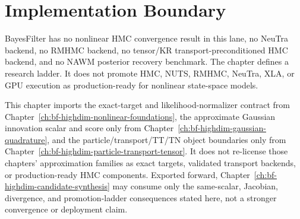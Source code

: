 \section{Implementation Boundary}
\label{sec:bf-hd-hmc-boundary}

BayesFilter has no nonlinear HMC convergence result in this lane, no NeuTra
backend, no RMHMC backend, no tensor/KR transport-preconditioned HMC backend,
and no NAWM posterior recovery benchmark.  The chapter defines a research
ladder.  It does not promote HMC, NUTS, RMHMC, NeuTra, XLA, or GPU execution as
production-ready for nonlinear state-space models.

This chapter imports the exact-target and likelihood-normalizer contract from
Chapter~\ref{ch:bf-highdim-nonlinear-foundations}, the approximate Gaussian
innovation scalar and score only from
Chapter~\ref{ch:bf-highdim-gaussian-quadrature}, and the particle/transport/TT/TN
object boundaries only from Chapter~\ref{ch:bf-highdim-particle-transport-tensor}.
It does not re-license those chapters' approximation families as exact targets,
validated transport backends, or production-ready HMC components.  Exported
forward, Chapter~\ref{ch:bf-highdim-candidate-synthesis} may consume only the
same-scalar, Jacobian, divergence, and promotion-ladder consequences stated
here, not a stronger convergence or deployment claim.
